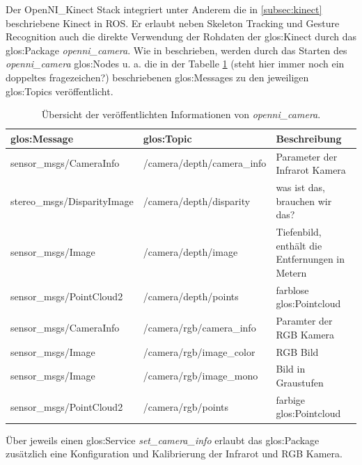 Der OpenNI\_Kinect Stack integriert unter Anderem die in \ref{subsec:kinect} beschriebene Kinect in \gls{ROS}. Er erlaubt neben Skeleton Tracking und Gesture Recognition auch die direkte Verwendung der Rohdaten der \gls{glos:Kinect} durch das \gls{glos:Package} \emph{openni\_camera}. Wie in \cite{online:rosopenni_camera} beschrieben, werden durch das Starten des \emph{openni\_camera} \glspl{glos:Node} u. a. die in der Tabelle \ref{tab:opennicameramsgs} {\color{red} (steht hier immer noch ein doppeltes fragezeichen?)} beschriebenen \glspl{glos:Message} zu den jeweiligen \glspl{glos:Topic} veröffentlicht.
\begin{table}
\label{tab:opennicameramsgs}
\begin{tabular}{ l l p{4.3cm} }
	\hline
	\gls{glos:Message}			&	\gls{glos:Topic}						& 	Beschreibung\\
	\hline
	sensor\_msgs/CameraInfo		&	/camera/depth/camera\_info			&	Parameter der Infrarot Kamera\\
	stereo\_msgs/DisparityImage	&	/camera/depth/disparity				&	{\color{red}was ist das, brauchen wir das?}\\
	sensor\_msgs/Image			&	/camera/depth/image					&	Tiefenbild, enthält die Entfernungen in Metern\\
	sensor\_msgs/PointCloud2		&	/camera/depth/points					&	farblose \gls{glos:Pointcloud}\\
	\hline
	sensor\_msgs/CameraInfo		&	/camera/rgb/camera\_info				&	Paramter der RGB Kamera\\
	sensor\_msgs/Image			&	/camera/rgb/image\_color				&	RGB Bild\\
	sensor\_msgs/Image			&	/camera/rgb/image\_mono				&	Bild in Graustufen\\
	sensor\_msgs/PointCloud2		&	/camera/rgb/points					&	farbige \gls{glos:Pointcloud}\\
	\hline
\end{tabular}
\caption[Topic-Übersicht von openni\_camera]{Übersicht der veröffentlichten Informationen von \emph{openni\_camera}.}
\end{table}
Über jeweils einen \gls{glos:Service} \emph{set\_camera\_info} erlaubt das \gls{glos:Package} zusätzlich eine Konfiguration und Kalibrierung der Infrarot und RGB Kamera.


